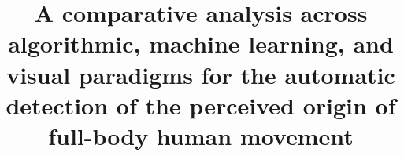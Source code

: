 \setcounter{memberrowno}{0}

\title{A comparative analysis across algorithmic, machine learning, and visual paradigms for the automatic detection of the perceived origin of full-body human movement}
\renewcommand{\headrulewidth}{0.2pt}
\renewcommand{\contentsname}{\Huge Table of contents}
\renewcommand{\listfigurename}{\Huge List of Figures}
\renewcommand{\listtablename}{\Huge List of Tables}


\setlength{\parskip}{10pt}   %

\hypersetup{
    colorlinks=true,          %
    linkcolor=black,          %
    urlcolor=blue,
    citecolor=blue
}
\setlength{\parskip}{10pt}   %



